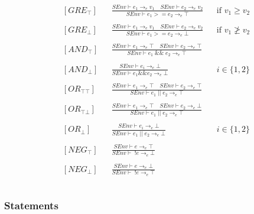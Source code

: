 \begin{align*}
&[GRE_\top] & &\frac{SEnv \vdash e_1 \rightarrow_e v_1 \quad SEnv \vdash e_2 \rightarrow_e v_2}{SEnv \vdash e_1 >= e_2 \rightarrow_e \top} & &\text{if } v_1 \geq v_2\\\\
&[GRE_\bot] & &\frac{SEnv \vdash e_1 \rightarrow_e v_1 \quad SEnv \vdash e_2 \rightarrow_e v_2}{SEnv \vdash e_1 >= e_2 \rightarrow_e \bot} & &\text{if } v_1 \ngeq v_2\\\\
&[AND_\top] & &\frac{SEnv \vdash e_1 \rightarrow_e \top \quad SEnv \vdash e_2 \rightarrow_e \top}{SEnv \vdash e_1\; \&\&\; e_2 \rightarrow_e \top}\\\\
&[AND_\bot] & &\frac{SEnv \vdash e_i \rightarrow_e \bot}{SEnv \vdash e_1 \&\& e_2 \rightarrow_e \bot} & &i \in \{1, 2\}\\\\
&[OR_{\top\top}] & &\frac{SEnv \vdash e_1 \rightarrow_e \top \quad SEnv \vdash e_2 \rightarrow_e \top}{SEnv \vdash e_1\; ||\; e_2 \rightarrow_e \top}\\\\
&[OR_{\top\bot}] & &\frac{SEnv \vdash e_1 \rightarrow_e \top \quad SEnv \vdash e_2 \rightarrow_e \bot}{SEnv \vdash e_1\; ||\; e_2 \rightarrow_e \top}\\\\
&[OR_\bot] & &\frac{SEnv \vdash e_i \rightarrow_e \bot}{SEnv \vdash e_1 \;||\; e_2 \rightarrow_e \bot} & &i \in \{1, 2\}\\\\
&[NEG_\top] & &\frac{SEnv \vdash e \rightarrow_e \top}{SEnv \vdash\; !e \rightarrow_e \bot}\\\\
&[NEG_\bot] & &\frac{SEnv \vdash e \rightarrow_e \bot}{SEnv \vdash\; !e \rightarrow_e \top}\\\\
\end{align*}

\subsubsection{Statements}

